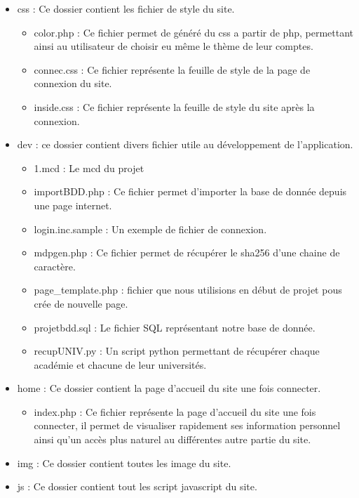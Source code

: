 \documentclass[a4paper,10pt]{report}
\begin{document}
\begin{itemize}
    \item css : Ce dossier contient les fichier de style du site.
    \begin{itemize}
        \item color.php : Ce fichier permet de g\'en\'er\'e du css a partir de php, permettant ainsi au utilisateur de choisir eu m\^eme le th\`eme de leur comptes.
        \item connec.css : Ce fichier repr\'esente la feuille de style de la page de connexion du site.
        \item inside.css : Ce fichier repr\'esente la feuille de style du site apr\`es la connexion.
    \end{itemize}
    \item dev : ce dossier contient divers fichier utile au d\'eveloppement de l'application.
    \begin{itemize}
        \item 1.mcd : Le mcd du projet
        \item importBDD.php : Ce fichier permet d'importer la base de donn\'ee depuis une page internet.
        \item login.inc.sample : Un exemple de fichier de connexion.
        \item mdpgen.php : Ce fichier permet de r\'ecup\'erer le sha256 d'une chaine de caract\`ere.
        \item page\_template.php : fichier que nous utilisions en d\'ebut de projet pous cr\'ee de nouvelle page.
        \item projetbdd.sql : Le fichier SQL repr\'esentant notre base de donn\'ee.
        \item recupUNIV.py : Un script python permettant de r\'ecup\'erer chaque acad\'emie et chacune de leur universit\'es.
    \end{itemize}
    \item home : Ce dossier contient la page d'accueil du site une fois connecter.
    \begin{itemize}
        \item index.php : Ce fichier repr\'esente la page d'accueil du site une fois connecter, il permet de visualiser rapidement ses information personnel
        ainsi qu'un acc\`es plus naturel au diff\'erentes autre partie du site.
    \end{itemize}
    \item img : Ce dossier contient toutes les image du site.
    \item js : Ce dossier contient tout les script javascript du site.

\end{itemize}
\end{document}
